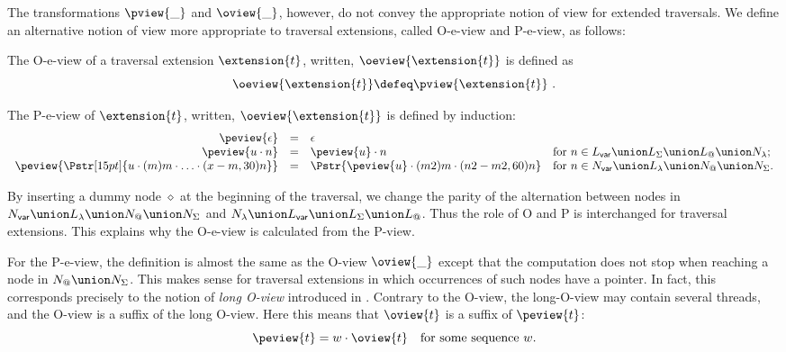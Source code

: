 The transformations $\pview{\_}$ and $\oview{\_}$, however, do not convey the appropriate notion
of view for extended traversals. We define an alternative notion of
view more appropriate to traversal extensions, called O-e-view and P-e-view, as follows:
\begin{definition}
\label{eqn:def_eview}

The O-e-view of a traversal extension $\extension{t}$, written, $\oeview{\extension{t}}$ is defined as
\begin{equation*}
\oeview{\extension{t}} \defeq \pview{\extension{t}} \ .
\end{equation*}

The P-e-view of $\extension{t}$, written, $\oeview{\extension{t}}$ is defined by induction:
$$\begin{array}{rcll}
 \peview{\epsilon} &=&  \epsilon \\
 \peview{u \cdot n }  &=&  \peview{u} \cdot n
    & \mbox{for $n \in L_{\sf var} \union L_\Sigma \union L_@ \union N_\lambda$;}
    \\
 \peview{\Pstr[15pt]{u \cdot (m){m} \cdot \ldots \cdot (x-m,30){n}}} &=&
    \Pstr{ \peview{u} \cdot (m2){m} \cdot (n2-m2,60){n} }
    & \mbox{for $n \in N_{\sf var} \union L_\lambda \union N_@ \union N_\Sigma$.}
\end{array}$$

\end{definition}

By inserting a dummy node $\diamond$ at the beginning of the traversal, we
change the parity of the alternation between nodes in $N_{\sf
var} \union L_\lambda \union N_@ \union N_\Sigma$ and $N_\lambda
\union L_{\sf var} \union L_\Sigma \union L_@$.
Thus the role of O and P is interchanged for traversal extensions. This explains why the O-e-view is calculated from the P-view.

For the P-e-view, the definition is almost the same as the O-view $\oview{\_}$ except that the computation does not stop when reaching a node
in $N_@ \union N_\Sigma$. This makes sense for traversal extensions in which occurrences of such nodes have a pointer. In fact, this corresponds precisely to the notion of \emph{long O-view} introduced in \cite{Harmer2005}. Contrary to the O-view, the long-O-view may contain several threads, and the O-view is a suffix of the long O-view. Here this means that $\oview{t}$ is a suffix of $\peview{t}$:
\begin{equation}
  \peview{t} = w \cdot \oview{t} \quad \mbox{for some sequence $w$.} \label{eqn:oview_suffix_preview}
\end{equation}
\smallskip

